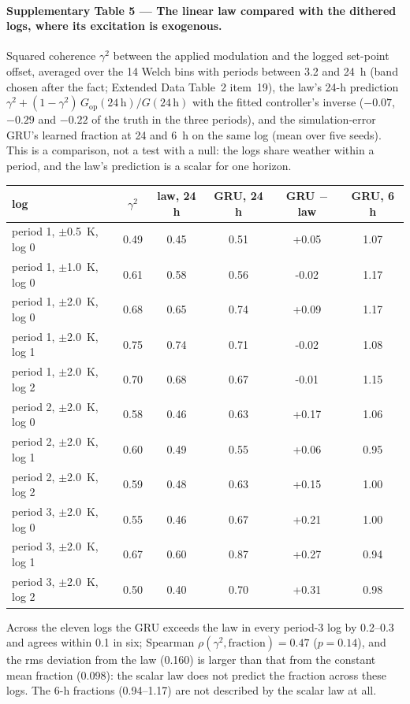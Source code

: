 \documentclass[11pt]{article}
\begin{document}
\paragraph{Supplementary Table 5 --- The linear law compared with the dithered logs, where its excitation is exogenous.} Squared coherence $\gamma^2$ between the applied modulation and the logged set-point offset, averaged over the 14 Welch bins with periods between 3.2 and 24~h (band chosen after the fact; Extended Data Table~2 item~19), the law's 24-h prediction $\gamma^2 + (1-\gamma^2)\,G_{\mathrm{op}}(24\,\mathrm{h})/G(24\,\mathrm{h})$ with the fitted controller's inverse ($-0.07$, $-0.29$ and $-0.22$ of the truth in the three periods), and the simulation-error GRU's learned fraction at 24 and 6~h on the same log (mean over five seeds). This is a comparison, not a test with a null: the logs share weather within a period, and the law's prediction is a scalar for one horizon.
\begin{center}\small\begin{tabular}{lccccc}\toprule log & $\gamma^2$ & law, 24 h & GRU, 24 h & GRU $-$ law & GRU, 6 h\\\midrule
period 1, $\pm$0.5~K, log 0 & 0.49 & 0.45 & 0.51 & +0.05 & 1.07\\
period 1, $\pm$1.0~K, log 0 & 0.61 & 0.58 & 0.56 & -0.02 & 1.17\\
period 1, $\pm$2.0~K, log 0 & 0.68 & 0.65 & 0.74 & +0.09 & 1.17\\
period 1, $\pm$2.0~K, log 1 & 0.75 & 0.74 & 0.71 & -0.02 & 1.08\\
period 1, $\pm$2.0~K, log 2 & 0.70 & 0.68 & 0.67 & -0.01 & 1.15\\
period 2, $\pm$2.0~K, log 0 & 0.58 & 0.46 & 0.63 & +0.17 & 1.06\\
period 2, $\pm$2.0~K, log 1 & 0.60 & 0.49 & 0.55 & +0.06 & 0.95\\
period 2, $\pm$2.0~K, log 2 & 0.59 & 0.48 & 0.63 & +0.15 & 1.00\\
period 3, $\pm$2.0~K, log 0 & 0.55 & 0.46 & 0.67 & +0.21 & 1.00\\
period 3, $\pm$2.0~K, log 1 & 0.67 & 0.60 & 0.87 & +0.27 & 0.94\\
period 3, $\pm$2.0~K, log 2 & 0.50 & 0.40 & 0.70 & +0.31 & 0.98\\
\bottomrule\end{tabular}\end{center} Across the eleven logs the GRU exceeds the law in every period-3 log by 0.2--0.3 and agrees within 0.1 in six; Spearman $\rho(\gamma^2, \text{fraction}) = 0.47$ ($p = 0.14$), and the rms deviation from the law (0.160) is larger than that from the constant mean fraction (0.098): the scalar law does not predict the fraction across these logs. The 6-h fractions (0.94--1.17) are not described by the scalar law at all.
\end{document}
